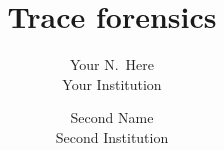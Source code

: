 \newcommand{\paa}[1]{{\textcolor{red}{[[#1 -- paa]]}}}
\newcommand{\kam}[1]{{\textcolor{blue}{[[#1 -- kam]]}}}



\date{}

\title{\Large \bf Trace forensics}

\author{
{\rm Your N.\ Here}\\
Your Institution
\and
{\rm Second Name}\\
Second Institution
} %

\maketitle

\begin{abstract}

\end{abstract}




















